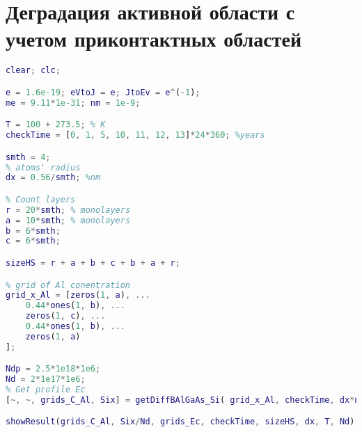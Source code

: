 \chapter{Деградация активной области с учетом приконтактных областей}
\label{app:DSi}
\begin{lstlisting}[style=realcode,language=Matlab,caption={Деградация активной области с учетом приконтактных областей},label={lst:DSi}]
clear; clc;

e = 1.6e-19; eVtoJ = e; JtoEv = e^(-1); 
me = 9.11*1e-31; nm = 1e-9;

T = 100 + 273.5; % K
checkTime = [0, 1, 5, 10, 11, 12, 13]*24*360; %years

smth = 4;
% atoms' radius
dx = 0.56/smth; %nm

% Count layers
r = 20*smth; % monolayers
a = 10*smth; % monolayers
b = 6*smth;
c = 6*smth;

sizeHS = r + a + b + c + b + a + r;

% grid of Al conentration
grid_x_Al = [zeros(1, a), ...
	0.44*ones(1, b), ...
	zeros(1, c), ...
	0.44*ones(1, b), ...
	zeros(1, a)
];

Ndp = 2.5*1e18*1e6;
Nd = 2*1e17*1e6;
% Get profile Ec
[~, ~, grids_C_Al, Six] = getDiffBAlGaAs_Si( grid_x_Al, checkTime, dx*nm, T, Ndp, Nd, r);

showResult(grids_C_Al, Six/Nd, grids_Ec, checkTime, sizeHS, dx, T, Nd);
\end{lstlisting}

